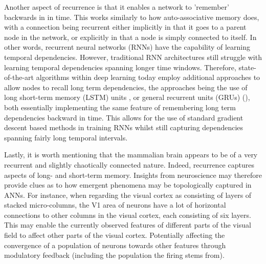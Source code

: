 Another aspect of recurrence is that it enables a network to 'remember' backwards in in time. This works similarly to how auto-associative memory does, with a connection being recurrent either implicitly in that it goes to a parent node in the network, or explicitly in that a node is simply connected to itself. In other words, recurrent neural networks (RNNs) have the capability of learning temporal dependencies. However, traditional RNN architectures still struggle with learning temporal dependencies spanning longer time windows. Therefore, state-of-the-art algorithms within deep learning today employ additional approaches to allow nodes to recall long term dependencies, the approaches being the use of long short-term memory (LSTM) units \cite{Hochreiter1997}, or general recurrent units (GRUs) (\cite{Cho2014}), both essentially implementing the same feature of remembering long term dependencies backward in time. This allows for the use of standard gradient descent based methods in training RNNs whilst still capturing dependencies spanning fairly long temporal intervals.

Lastly, it is worth mentioning that the mammalian brain appears to be of a very recurrent and slightly chaotically connected nature. Indeed, recurrence captures aspects of long- and short-term memory. Insights from neuroscience may therefore provide clues as to how emergent phenomena may be topologically captured in ANNs.
For instance, when regarding the visual cortex as consisting of layers of stacked micro-columns, the V1 area of neurons have a lot of horizontal connections to other columns in the visual cortex, each consisting of six layers. This may enable the currently observed features of different parts of the visual field to affect other parts of the visual cortex. Potentially affecting the convergence of a population of neurons towards other features through modulatory feedback (including the population the firing stems from).
\\

